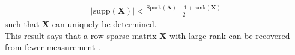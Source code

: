 \begin{align*}
\vert \text{supp}(\mathbf{X}) \vert < \frac{\text{Spark} (\mathbf{A}) - 1 + \text{rank}(\mathbf{X})}{2}
\end{align*}
such that $\mathbf{X}$ can uniquely be determined.
\\
This result says that a row-sparse matrix $\mathbf{X}$ with large rank can be recovered from fewer measurement \cite[p. 43]{CS}.


